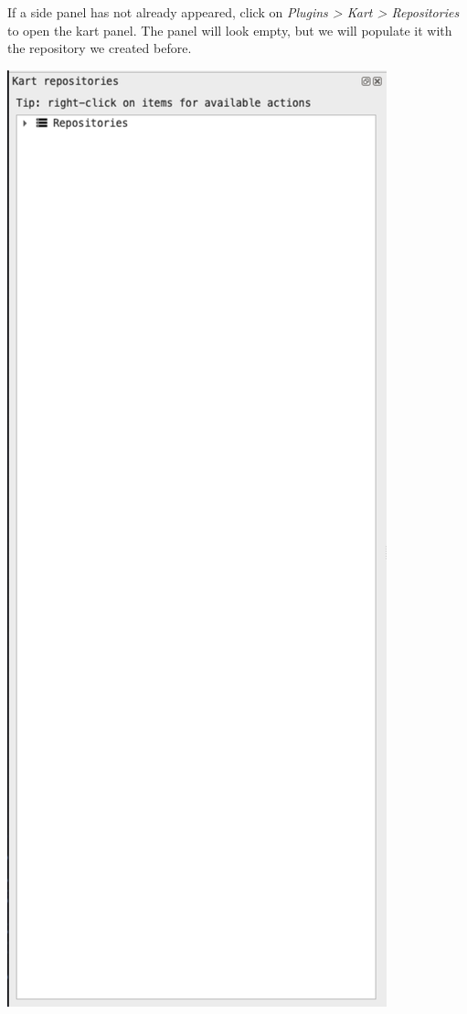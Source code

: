 \documentclass[
  letterpaper,
  DIV=11,
  numbers=noendperiod]{scrartcl}
\begin{document}
If a side panel has not already appeared, click on \emph{Plugins
\textgreater{} Kart \textgreater{} Repositories} to open the kart panel.
The panel will look empty, but we will populate it with the repository
we created before.

\begin{center}
\includegraphics{img/kart-panel.png}
\end{center}
\end{document}
